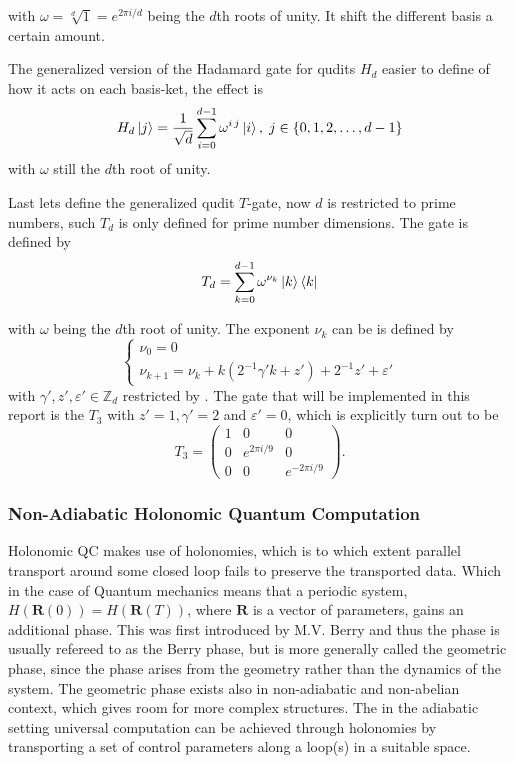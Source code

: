 with $\omega = \sqrt[d]{1} = e^{2\pi i/d}$ being the $d$th roots of unity. It shift the different basis a certain amount.

The generalized version of the Hadamard gate for qudits $H_d$ easier to define of how it acts on each basis-ket, the effect is 
\begin{equation}
H_d\ket{j} = \dfrac{1}{\sqrt{d}}\sum_{i=0}^{d-1} \omega^{i\,j}\ket{i},\; j\in \{0,1,2, \dots, d-1\}
\end{equation}
with $\omega$ still the $d$th root of unity.

Last lets define the generalized qudit $T$-gate, now $d$ is restricted to prime numbers, such $T_d$ is only defined for prime number dimensions. 
The gate is defined by
\begin{equation}
T_d = \sum_{k=0}^{d-1} \omega^{\nu_k}\ket{k}\bra{k}
\end{equation}

with $\omega$ being the $d$th root of unity. The exponent $\nu_k$ can be is defined by
\begin{equation}
\begin{cases}
\nu_0 = 0\\
\nu_{k+1} = \nu_k + k(2^{-1}\gamma'k + z') + 2^{-1}z' + \varepsilon'
\end{cases}
\end{equation} 
with $\gamma',z',\varepsilon' \in \mathbb{Z}_d$ restricted by .
The gate that will be implemented in this report is the $T_3$ with $z' = 1, \gamma' = 2$ and $\varepsilon' = 0$, which is explicitly turn out to be 
\begin{equation}
T_3 = \begin{pmatrix}
1 & 0 & 0\\
0 & e^{2\pi i/9}& 0 \\
0 & 0 & e^{-2\pi i /9}
\end{pmatrix}.
\end{equation}



\subsubsection{Non-Adiabatic Holonomic Quantum Computation}
Holonomic QC makes use of holonomies, which is to which extent parallel transport around some closed loop fails to preserve the transported data. Which in the case of Quantum mechanics means that a periodic system, $H(\mathbf{R}(0)) = H(\mathbf{R}(T))$, where $\mathbf{R}$ is a vector of parameters, gains an additional phase. This was first introduced by M.V. Berry\cite{berry} and thus the phase is usually refereed to as the Berry phase, but is more generally called the geometric phase, since the phase arises from the geometry rather than the dynamics of the system. The geometric phase exists also in non-adiabatic and non-abelian context, which gives room for more complex structures\cite{anandan1}\cite{anandan2}\cite{zee}. 
The in the adiabatic setting universal computation can be achieved through holonomies by transporting a set of control parameters along a loop(s) in a suitable space\cite{HQC}.

